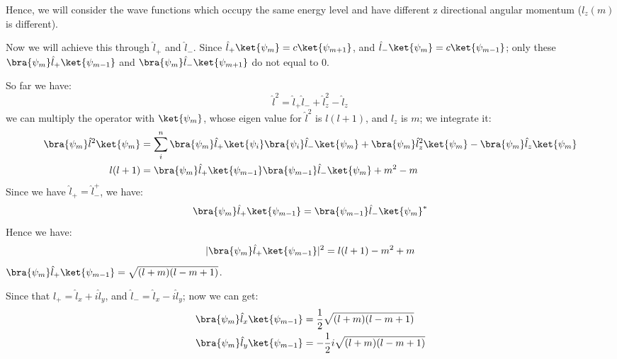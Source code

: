 Hence, we will consider the wave functions which occupy the same
energy level and have different z directional angular momentum
($l_{z}(m)$ is different).

Now we will achieve this through $\hat{l}_{+}$ and $\hat{l}_{-}$.
Since $\hat{l}_{+}\ket{\psi_{m}} = c\ket{\psi_{m+1}}$, and
$\hat{l}_{-}\ket{\psi_{m}} = c\ket{\psi_{m-1}}$; only these
$\bra{\psi_{m}}\hat{l}_{+}\ket{\psi_{m-1}}$ and
$\bra{\psi_{m}}\hat{l}_{-}\ket{\psi_{m+1}}$ do not equal to $0$.

So far we have:
\begin{equation}\label{}
\hat{l}^{2} = \hat{l}_{+}\hat{l}_{-} + \hat{l}^{2}_{z} - \hat{l}_{z}
\end{equation}
we can multiply the operator with $\ket{\psi_{m}}$, whose eigen
value for $\hat{l}^{2}$ is $l(l+1)$, and $l_{z}$ is $m$; we
integrate it:
\begin{align}\label{}
\bra{\psi_{m}}\hat{l}^{2}\ket{\psi_{m}} &= \sum_{i}^{n}
\bra{\psi_{m}}\hat{l}_{+}\ket{\psi_{i}}
\bra{\psi_{i}}\hat{l}_{-}\ket{\psi_{m}} +
\bra{\psi_{m}}\hat{l}^{2}_{z}\ket{\psi_{m}} -
\bra{\psi_{m}}\hat{l}_{z}\ket{\psi_{m}} \nonumber \\
l(l+1) &= \bra{\psi_{m}}\hat{l}_{+}\ket{\psi_{m-1}}
\bra{\psi_{m-1}}\hat{l}_{-}\ket{\psi_{m}} + m^{2} -m
\end{align}
Since we have $\hat{l}_{+} = \hat{l}_{-}^{+}$, we have:
\begin{equation}\label{}
\bra{\psi_{m}}\hat{l}_{+}\ket{\psi_{m-1}} =
\bra{\psi_{m-1}}\hat{l}_{-}\ket{\psi_{m}}^{*}
\end{equation}
Hence we have:
\begin{equation}\label{}
|\bra{\psi_{m}}\hat{l}_{+}\ket{\psi_{m-1}}|^{2} = l(l+1)-m^{2}+m
\end{equation}
$\bra{\psi_{m}}\hat{l}_{+}\ket{\psi_{m-1}}= \sqrt{(l+m)(l-m+1)}$.

Since that $\hat{l}_{+} = \hat{l}_{x} + i\hat{l}_{y}$, and
$\hat{l}_{-} = \hat{l}_{x} - i\hat{l}_{y}$; now we can get:
\begin{align}\label{}
\bra{\psi_{m}}\hat{l}_{x}\ket{\psi_{m-1}} &=
\frac{1}{2}\sqrt{(l+m)(l-m+1)} \nonumber \\
\bra{\psi_{m}}\hat{l}_{y}\ket{\psi_{m-1}} &=
-\frac{1}{2}i\sqrt{(l+m)(l-m+1)}
\end{align}





